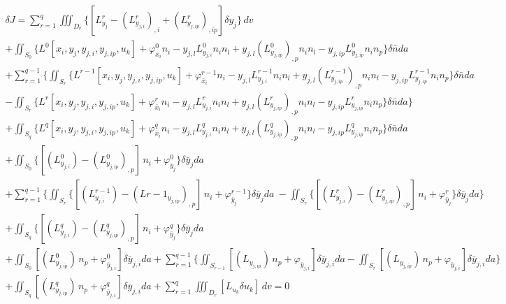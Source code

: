 \begin{multline} \label{eq:(bianfen.2.2)}    
\delta J = 
\sum_{r=1}^{q} \iiint_{D_r} \{[L^r_{y_j} - \left(L^r_{y_{j,i}}\right)_{,i}+\left(L^r_{y_{j,ip}}\right)_{,ip}]\delta y_j \}\,dv 
\\+\iint_{S_0} \{L^0 [x_i,y_j,y_{j,i},y_{j,ip},u_k]+ \varphi^0 _{\bar{x}_i} n_i 
-y_{j,l} L^0_{y_{j,i}} n_i n_l   + y_{j,l} \left(L^0_{y_{j,ip}}\right)_{,p} n_i n_l 
-y_{j,ip} L^0_{y_{j,ip}} n_i  n_p \}\delta \bar{n} da
\\+\sum_{r=1}^{q-1}\{\iint_{S_r} \{L^{r-1}[x_i,y_j,y_{j,i},y_{j,ip},u_k]+ \varphi^{r-1}_{\bar{x}_i} n_i 
-y_{j,l} L^{r-1}_{y_{j,i}} n_i n_l   + y_{j,l} \left(L^{r-1}_{y_{j,ip}}\right)_{,p} n_i n_l 
-y_{j,ip} L^{r-1}_{y_{j,ip}} n_i  n_p \}\delta \bar{n} da
\\-\iint_{S_r} \{L^{r}[x_i,y_j,y_{j,i},y_{j,ip},u_k]+ \varphi^{r}_{\bar{x}_i} n_i 
-y_{j,l} L^{r}_{y_{j,i}} n_i n_l   + y_{j,l} \left(L^{r}_{y_{j,ip}}\right)_{,p} n_i n_l 
-y_{j,ip} L^{r}_{y_{j,ip}} n_i  n_p \}\delta \bar{n} da\}
\\+\iint_{S_{q}} \{L^q [x_i,y_j,y_{j,i},y_{j,ip},u_k]+ \varphi^q_{\bar{x}_i} n_i 
-y_{j,l} L^q_{y_{j,i}} n_i n_l   + y_{j,l} \left(L^q_{y_{j,ip}}\right)_{,p} n_i n_l 
-y_{j,ip} L^q_{y_{j,ip}} n_i  n_p \}\delta \bar{n} da
\\+\iint_{S_0} \{[\left(L^0_{y_{j,i}}  \right) -\left(L^0_{y_{j,ip}}\right)_{,p}]\,n_i + \varphi^0_{\bar{y}_j} \}\delta \bar{y} _j da
\\+\sum_{r=1}^{q-1} \{\iint_{S_r} \{[\left(L^{r-1}_{y_{j,i}}  \right) -\left(L{r-1}_{y_{j,ip}}\right)_{,p}]\,n_i + \varphi^{r-1}_{\bar{y}_j} \}\delta \bar{y} _j da\
-\iint_{S_r} \{[\left(L^r_{y_{j,i}}  \right) -\left(L^r_{y_{j,ip}}\right)_{,p}]\,n_i + \varphi^r_{\bar{y}_j} \}\delta \bar{y} _j da\}
\\+\iint_{S_{q}} \{[\left(L^q_{y_{j,i}}  \right) -\left(L^q_{y_{j,ip}}\right)_{,p}]\,n_i + \varphi^q_{\bar{y}_j} \}\delta \bar{y} _j da
\\+\iint_{S_0} [\left(L^0_{y_{j,ip}}  \right)\,n_p +\varphi^0_{\bar{y}_{j,i}}] \delta \bar{y}_{j,i} da
+\sum_{r=1}^{q-1} \{\iint_{S_{r-1}} [\left(L_{y_{j,ip}}  \right)\,n_p +\varphi_{\bar{y}_{j,i}}] \delta \bar{y}_{j,i} da-\iint_{S_r} [\left(L_{y_{j,ip}}  \right)\,n_p +\varphi_{\bar{y}_{j,i}}] \delta \bar{y}_{j,i} da\}
\\+\iint_{S_{q}} [\left(L^q_{y_{j,ip}}  \right)\,n_p +\varphi^q_{\bar{y}_{j,i}}] \delta \bar{y}_{j,i} da+\sum_{r=1}^{q} \iiint_{D_r} [L_{u_k} \delta u_k] \,dv=0
\end{multline} 
